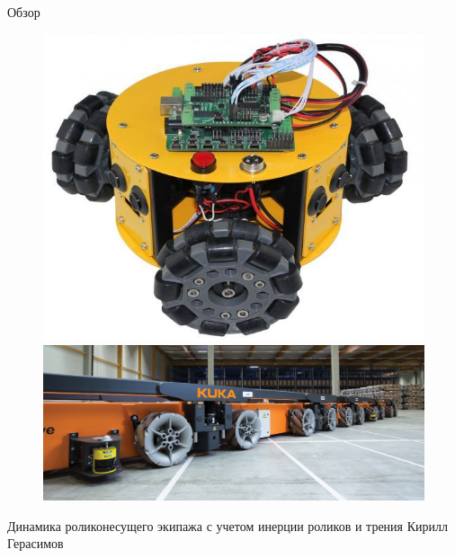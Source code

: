 \begin{myposter}{
    Обзор
}
{\begin{figure}[H]
            \endminipage
        \end{figure}
        \vspace{-10pt}
        \begin{figure}[H]
            \centering
                \centering
                \includegraphics[width=\linewidth]{content/pic/photo/vehicle_three_two_row.jpg}
            \endminipage
                \centering
                \includegraphics[width=\linewidth]{content/pic/photo/vehicle_kuka.png}
            \endminipage
        \end{figure}
    }
    
    \vspace{50pt}
    \huge{Динамика роликонесущего экипажа с учетом инерции роликов и трения}
    \Large{Кирилл Герасимов}
    
\end{myposter}
